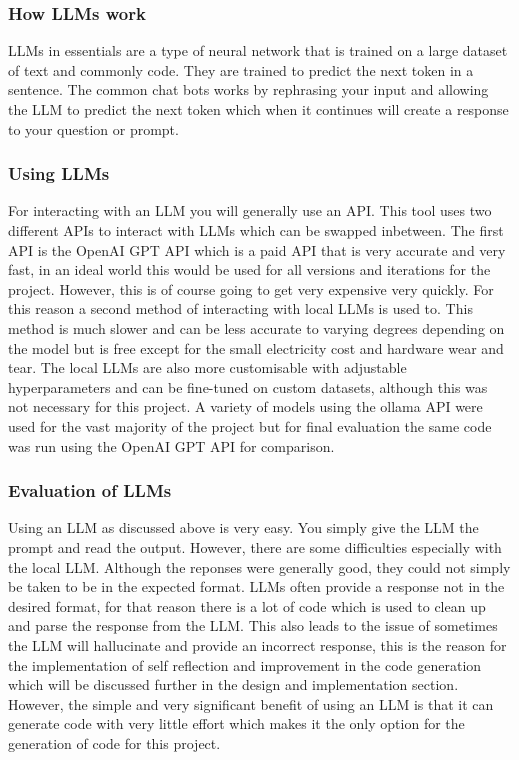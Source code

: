 \documentclass[12pt]{extarticle}
\begin{document}
\subsubsection{How LLMs work}

LLMs in essentials are a type of neural network that is trained on a large dataset of text and commonly code. They are trained to predict the next token in a sentence. The common chat bots works by rephrasing your input and allowing the LLM to predict the next token which when it continues will create a response to your question or prompt.

\subsubsection{Using LLMs}

For interacting with an LLM you will generally use an API. This tool uses two different APIs to interact with LLMs which can be swapped inbetween. The first API is the OpenAI GPT API which is a paid API that is very accurate and very fast, in an ideal world this would be used for all versions and iterations for the project. However, this is of course going to get very expensive very quickly. For this reason a second method of interacting with local LLMs is used to. This method is much slower and can be less accurate to varying degrees depending on the model but is free except for the small electricity cost and hardware wear and tear. The local LLMs are also more customisable with adjustable hyperparameters and can be fine-tuned on custom datasets, although this was not necessary for this project. A variety of models using the ollama API were used for the vast majority of the project but for final evaluation the same code was run using the OpenAI GPT API for comparison.

\subsubsection{Evaluation of LLMs}

Using an LLM as discussed above is very easy. You simply give the LLM the prompt and read the output. However, there are some difficulties especially with the local LLM. Although the reponses were generally good, they could not simply be taken to be in the expected format. LLMs often provide a response not in the desired format, for that reason there is a lot of code which is used to clean up and parse the response from the LLM. This also leads to the issue of sometimes the LLM will hallucinate and provide an incorrect response, this is the reason for the implementation of self reflection and improvement in the code generation which will be discussed further in the design and implementation section. However, the simple and very significant benefit of using an LLM is that it can generate code with very little effort which makes it the only option for the generation of code for this project.
\end{document}
